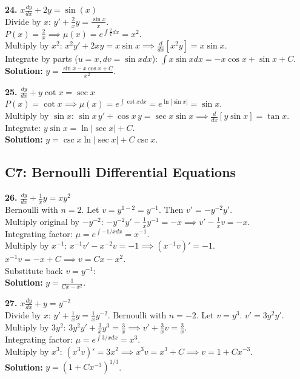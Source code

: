 \documentclass[11pt]{article}
\begin{document}
\vspace{0.5cm}
\textbf{24.} $x \frac{dy}{dx} + 2y = \sin(x)$ \\
Divide by $x$: $y' + \frac{2}{x}y = \frac{\sin x}{x}$. \\
$P(x) = \frac{2}{x} \implies \mu(x) = e^{\int \frac{2}{x} dx} = x^2$. \\
Multiply by $x^2$: $x^2 y' + 2xy = x\sin x \implies \frac{d}{dx}[x^2 y] = x\sin x$. \\
Integrate by parts ($u=x, dv=\sin x dx$): $\int x\sin x dx = -x\cos x + \sin x + C$. \\
\textbf{Solution:} $y = \frac{\sin x - x\cos x + C}{x^2}$.

\vspace{0.5cm}
\textbf{25.} $\frac{dy}{dx} + y \cot x = \sec x$ \\
$P(x) = \cot x \implies \mu(x) = e^{\int \cot x dx} = e^{\ln|\sin x|} = \sin x$. \\
Multiply by $\sin x$: $\sin x \, y' + \cos x \, y = \sec x \sin x \implies \frac{d}{dx}[y \sin x] = \tan x$. \\
Integrate: $y \sin x = \ln|\sec x| + C$. \\
\textbf{Solution:} $y = \csc x \ln|\sec x| + C \csc x$.

\subsection*{C7: Bernoulli Differential Equations}

\textbf{26.} $\frac{dy}{dx} + \frac{1}{x}y = x y^2$ \\
Bernoulli with $n=2$. Let $v = y^{1-2} = y^{-1}$. Then $v' = -y^{-2}y'$. \\
Multiply original by $-y^{-2}$: $-y^{-2}y' - \frac{1}{x}y^{-1} = -x \implies v' - \frac{1}{x}v = -x$. \\
Integrating factor: $\mu = e^{\int -1/x dx} = x^{-1}$. \\
Multiply by $x^{-1}$: $x^{-1}v' - x^{-2}v = -1 \implies (x^{-1}v)' = -1$. \\
$x^{-1}v = -x + C \implies v = Cx - x^2$. \\
Substitute back $v = y^{-1}$: \\
\textbf{Solution:} $y = \frac{1}{Cx - x^2}$.

\vspace{0.5cm}
\textbf{27.} $x \frac{dy}{dx} + y = y^{-2}$ \\
Divide by $x$: $y' + \frac{1}{x}y = \frac{1}{x}y^{-2}$. Bernoulli with $n = -2$. Let $v = y^3$. $v' = 3y^2y'$. \\
Multiply by $3y^2$: $3y^2y' + \frac{3}{x}y^3 = \frac{3}{x} \implies v' + \frac{3}{x}v = \frac{3}{x}$. \\
Integrating factor: $\mu = e^{\int 3/x dx} = x^3$. \\
Multiply by $x^3$: $(x^3 v)' = 3x^2 \implies x^3 v = x^3 + C \implies v = 1 + Cx^{-3}$. \\
\textbf{Solution:} $y = (1 + Cx^{-3})^{1/3}$.
\end{document}
